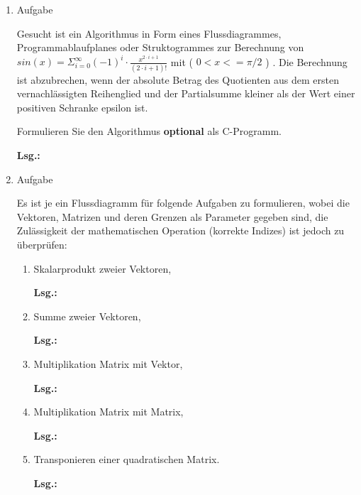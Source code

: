 \documentclass[12pt,a4paper,ngerman]{scrreprt}
\newcommand{\Lsg}{\par \textbf{Lsg.: \hfill }}
\begin{document}
\begin{enumerate}
\item Aufgabe %

Gesucht ist ein Algorithmus in Form eines Flussdiagrammes, Programmablaufplanes oder Struktogrammes zur Berechnung von
\begin{math}
sin(x)=\Sigma_{i=0}^{\infty} (-1)^i \cdot \frac{x^{2 \cdot i+1}}{(2 \cdot i + 1)!}
\end{math}
mit ( $0 < x <= \pi/2$ ) . Die Berechnung ist abzubrechen, wenn der absolute Betrag des Quotienten
aus dem ersten vernachlässigten Reihenglied und der Partialsumme kleiner als der Wert einer
positiven Schranke epsilon ist. \par Formulieren Sie den Algorithmus \textbf{optional} als C-Programm.

\Lsg

\item Aufgabe %

Es ist je ein Flussdiagramm für folgende Aufgaben zu formulieren, wobei die Vektoren, Matrizen und deren Grenzen als Parameter gegeben sind, die Zulässigkeit der mathematischen Operation (korrekte Indizes) ist jedoch zu überprüfen:

\begin{enumerate}
\item Skalarprodukt zweier Vektoren,

\Lsg

\item Summe zweier Vektoren,

\Lsg

\item Multiplikation Matrix mit Vektor,

\Lsg

\item Multiplikation Matrix mit Matrix,

\Lsg


\item Transponieren einer quadratischen Matrix.

\Lsg


\end{enumerate}
\end{enumerate}
\end{document}
